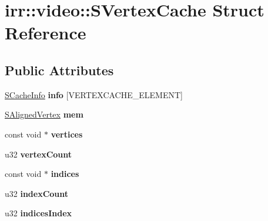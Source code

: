 \hypertarget{structirr_1_1video_1_1_s_vertex_cache}{\section{irr\-:\-:video\-:\-:S\-Vertex\-Cache Struct Reference}
\label{structirr_1_1video_1_1_s_vertex_cache}
}
\subsection*{Public Attributes}
\begin{DoxyCompactItemize}
\item 
\hypertarget{structirr_1_1video_1_1_s_vertex_cache_a028a2e6279597bf6b463bb5e195c3e75}{\hyperlink{structirr_1_1video_1_1_s_cache_info}{S\-Cache\-Info} {\bfseries info} \mbox{[}V\-E\-R\-T\-E\-X\-C\-A\-C\-H\-E\-\_\-\-E\-L\-E\-M\-E\-N\-T\mbox{]}}\label{structirr_1_1video_1_1_s_vertex_cache_a028a2e6279597bf6b463bb5e195c3e75}

\item 
\hypertarget{structirr_1_1video_1_1_s_vertex_cache_a780fff7552bb1a67e1daf39cd3d1f616}{\hyperlink{structirr_1_1video_1_1_s_aligned_vertex}{S\-Aligned\-Vertex} {\bfseries mem}}\label{structirr_1_1video_1_1_s_vertex_cache_a780fff7552bb1a67e1daf39cd3d1f616}

\item 
\hypertarget{structirr_1_1video_1_1_s_vertex_cache_a5fdc643682f4073697e8fca984be1cc6}{const void $\ast$ {\bfseries vertices}}\label{structirr_1_1video_1_1_s_vertex_cache_a5fdc643682f4073697e8fca984be1cc6}

\item 
\hypertarget{structirr_1_1video_1_1_s_vertex_cache_a115ad77152f39be1966b4097829ef739}{u32 {\bfseries vertex\-Count}}\label{structirr_1_1video_1_1_s_vertex_cache_a115ad77152f39be1966b4097829ef739}

\item 
\hypertarget{structirr_1_1video_1_1_s_vertex_cache_a41e99c61085d682775a4c2921a6c6092}{const void $\ast$ {\bfseries indices}}\label{structirr_1_1video_1_1_s_vertex_cache_a41e99c61085d682775a4c2921a6c6092}

\item 
\hypertarget{structirr_1_1video_1_1_s_vertex_cache_ac131c73515be3b513c4d5b1cd0680eb2}{u32 {\bfseries index\-Count}}\label{structirr_1_1video_1_1_s_vertex_cache_ac131c73515be3b513c4d5b1cd0680eb2}

\item 
\hypertarget{structirr_1_1video_1_1_s_vertex_cache_a91e733c8dd35f20c956b380793bb0b55}{u32 {\bfseries indices\-Index}}\label{structirr_1_1video_1_1_s_vertex_cache_a91e733c8dd35f20c956b380793bb0b55}


\end{DoxyCompactItemize}
